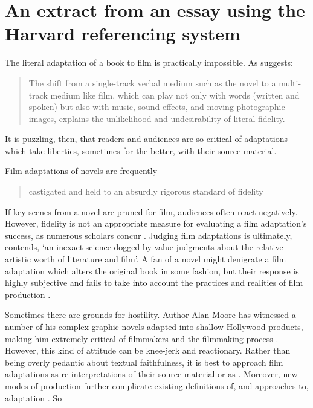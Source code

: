 \documentclass[a4paper,australian,oneside,12pt,footlines=3]{scrbook}%
\theoremstyle{remark}
\begin{document}
\chapter{An extract from an essay using the Harvard referencing system}
\begin{refsection}
\textelp{} The literal adaptation of a book to film is practically impossible. As \textcite[4]{Stam2005} suggests:
\blockquote{The shift from a single-track verbal medium such as the novel to a multi-track medium like film, which can play not only with words (written and spoken) but also with music, sound effects, and moving photographic images, explains the unlikelihood and \textelp{} undesirability of literal fidelity.}
It is puzzling, then, that readers and audiences are so critical of adaptations which take liberties, sometimes for the better, with their source material.

Film adaptations of novels are frequently 
\blockquote[{\parencite[15]{Stam2005a}}]{castigated and held to an absurdly rigorous standard of fidelity}. 
If key scenes from a novel are pruned for film, audiences often react negatively. However, fidelity is not an appropriate measure for evaluating a film adaptation’s success, as numerous scholars concur \parencite{Desmond2006,Leitch2008,McFarlane1996,Miller2004}. Judging film adaptations is ultimately, \textcite[9]{Whelehan1999} contends, ‘an inexact science dogged by value judgments about the relative artistic worth of literature and film’. A fan of a novel might denigrate a film adaptation which alters the original book in some fashion, but their response is highly subjective and fails to take into account the practices and realities of film production \parencite[26]{McFarlane2007}.

Sometimes there are grounds for hostility. Author Alan Moore has witnessed a number of his complex graphic novels adapted into shallow Hollywood products, making him extremely critical of filmmakers and the filmmaking process \parencite{Ahsurst2009}. However, this kind of attitude can be knee-jerk and reactionary. Rather than being overly pedantic about textual faithfulness, it is best to approach film adaptations as re-interpretations of their source material \parencite[8]{Hutcheon2006} or as 
. %
Moreover, new modes of production further complicate existing definitions of, and approaches to, adaptation \parencite[180]{Moore2010}. So\textelp{}

\printbibliography[heading=subbibliography]
\end{refsection}
\end{document}
